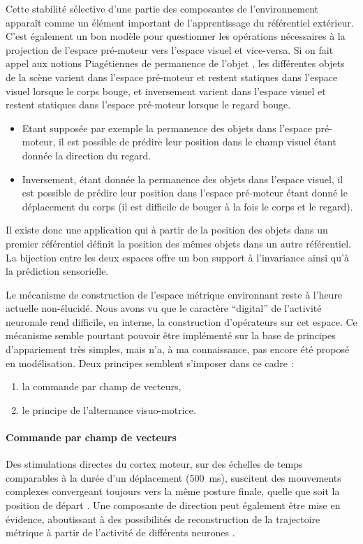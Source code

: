 \documentclass[11pt]{article}
\begin{document}
Cette stabilité sélective d'une partie des composantes de l'environnement apparaît comme un 
élément important de l'apprentissage du référentiel extérieur. 
C'est également un bon modèle pour questionner les opérations nécessaires à la projection de
l'espace pré-moteur vers l'espace visuel et vice-versa. Si on fait appel aux notions Piagétiennes
de permanence de l'objet \cite{Piaget1973}, les différentes objets de la scène varient dans l'espace pré-moteur 
et restent statiques dans l'espace visuel lorsque le corps bouge, et inversement varient dans l'espace visuel et 
restent statiques dans l'espace pré-moteur lorsque le regard bouge. \begin{itemize}
	\item Etant supposée par exemple la permanence
	des objets dans l'espace pré-moteur, il est possible de prédire leur position dans le champ visuel étant
	donnée la direction du regard.
	\item Inversement, étant donnée la permanence des objets dans l'espace visuel, il est possible
	de prédire leur position dans l'espace pré-moteur étant donné le déplacement du corps (il est difficile de bouger à la fois le corps et le regard).
\end{itemize} 


Il existe donc une application qui à partir de la position des objets dans un premier 
référentiel définit la position des mêmes objets dans un autre référentiel. 
La bijection entre les deux espaces offre
un bon support à l'invariance ainsi qu'à la prédiction sensorielle. %

Le mécanisme de construction de l'espace métrique environnant reste à l'heure actuelle non-élucidé. Nous avons vu que le caractère ``digital'' de l'activité neuronale rend difficile, en interne, la construction d'opérateurs sur cet espace.
Ce mécanisme semble pourtant pouvoir être implémenté sur la base de principes d'appariement très simples, mais n'a, à ma connaissance, pas encore été proposé en modélisation. Deux principes semblent s'imposer dans ce cadre : 
\begin{enumerate}
	\item la commande par champ de vecteurs,
	\item le principe de l'alternance visuo-motrice.
\end{enumerate}


\paragraph{Commande par champ de vecteurs} 
Des stimulations directes du cortex moteur, sur des échelles de temps
comparables à la durée d'un déplacement (500~ms), suscitent des mouvements
complexes convergeant toujours vers la même posture finale, quelle que soit la position
de départ . 
Une composante de direction peut également être mise en évidence, 
aboutissant à des possibilités de reconstruction de la
trajectoire métrique à partir de l'activité de différents neurones .
\end{document}

